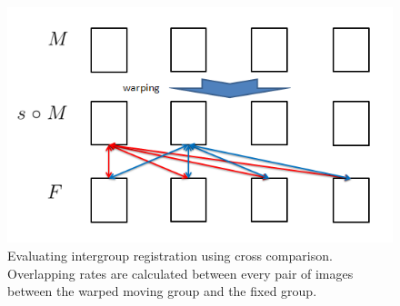 \documentclass[preprint,review,12pt]{elsarticle}
\begin{document}
\begin{figure}[thb]

\begin{center}

\includegraphics[width=.9\columnwidth]{figs/cross_compare.png}

\end{center}
\caption{Evaluating intergroup registration using cross comparison. Overlapping rates are calculated between every pair of images between the warped moving group and the fixed group.}
\label{fig:cross_compare}
\end{figure}
\end{document}
